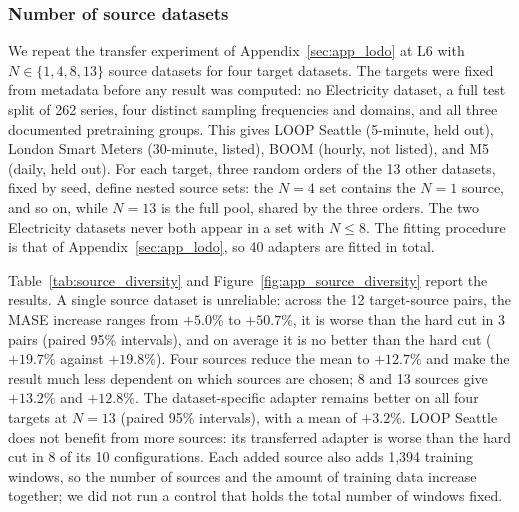 
\subsubsection{Number of source datasets}
\label{sec:app_source_diversity}

We repeat the transfer experiment of Appendix~\ref{sec:app_lodo} at L6 with $N\in\{1,4,8,13\}$ source datasets for four target datasets. The targets were fixed from metadata before any result was computed: no Electricity dataset, a full test split of 262 series, four distinct sampling frequencies and domains, and all three documented pretraining groups. This gives LOOP Seattle (5-minute, held out), London Smart Meters (30-minute, listed), BOOM (hourly, not listed), and M5 (daily, held out). For each target, three random orders of the 13 other datasets, fixed by seed, define nested source sets: the $N=4$ set contains the $N=1$ source, and so on, while $N=13$ is the full pool, shared by the three orders. The two Electricity datasets never both appear in a set with $N\le8$. The fitting procedure is that of Appendix~\ref{sec:app_lodo}, so 40 adapters are fitted in total.

Table~\ref{tab:source_diversity} and Figure~\ref{fig:app_source_diversity} report the results. A single source dataset is unreliable: across the 12 target-source pairs, the MASE increase ranges from $+5.0\%$ to $+50.7\%$, it is worse than the hard cut in 3 pairs (paired 95\% intervals), and on average it is no better than the hard cut ($+19.7\%$ against $+19.8\%$). Four sources reduce the mean to $+12.7\%$ and make the result much less dependent on which sources are chosen; 8 and 13 sources give $+13.2\%$ and $+12.8\%$. The dataset-specific adapter remains better on all four targets at $N=13$ (paired 95\% intervals), with a mean of $+3.2\%$. LOOP Seattle does not benefit from more sources: its transferred adapter is worse than the hard cut in 8 of its 10 configurations. Each added source also adds 1,394 training windows, so the number of sources and the amount of training data increase together; we did not run a control that holds the total number of windows fixed.

